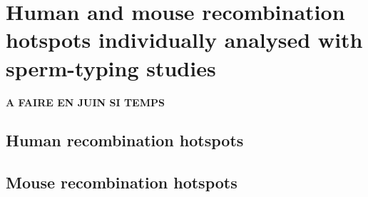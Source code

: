 %

\chapter{\label{app:list-hostpots}Human and mouse recombination hotspots individually analysed with sperm-typing studies}

\minitoc{}

\textbf{A FAIRE EN JUIN SI TEMPS}
\section{Human recombination hotspots}
\section{Mouse recombination hotspots}





